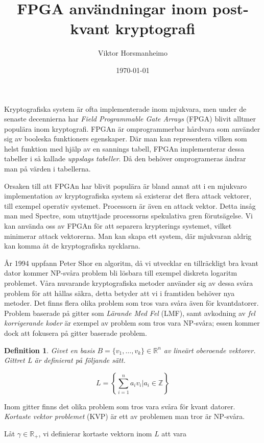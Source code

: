 \documentclass{paper}
\title{FPGA användningar inom post-kvant kryptografi}
\author{Viktor Horsmanheimo}
\date{\today}
\newtheorem{definition}{Definition}
\newcommand{\bR}{\mathbb{R}}
\newcommand{\bZ}{\mathbb{Z}}
\begin{document}
\maketitle

Kryptografiska system är ofta implementerade inom mjukvara, men under de
senaste decennierna har \textit{Field Programmable Gate Arrays} (FPGA) blivit
alltmer populära inom kryptografi. FPGAn är omprogrammerbar hårdvara som
använder sig av booleska funktioners egenskaper. Där man kan representera vilken
som helst funktion med hjälp av en sannings tabell, FPGAn implementerar dessa
tabeller i så kallade \textit{uppslags tabeller}. Då den behöver omprogrameras
ändrar man på värden i tabellerna.

Orsaken till att FPGAn har blivit populära är bland annat att i en mjukvaro
implementation av kryptografiska system så existerar det flera attack
vektorer, till exempel operativ systemet. Processorn är även en attack
vektor. Detta insåg man med Spectre, som utnyttjade processorns spekulativa
gren förutsägelse. Vi kan använda oss av FPGAn för att separera krypterings
systemet, vilket minimerar attack vektorerna. Man kan skapa ett system, där
mjukvaran aldrig kan komma åt de kryptografiska nycklarna.

År 1994 uppfann Peter Shor en algoritm, då vi utvecklar en tillräckligt bra kvant dator
kommer NP-svåra problem bli lösbara till exempel diskreta logaritm problemet.
Våra nuvarande kryptografiska metoder använder sig av dessa svåra problem för
att hållas säkra, detta betyder att vi i framtiden behöver nya metoder. Det
finns flera olika problem som tros vara svåra även för kvantdatorer.
Problem baserade på gitter som \textit{Lärande Med Fel} (LMF), samt avkodning av
\textit{fel korrigerande koder} är exempel av problem som tros vara NP-svåra;
essen kommer dock att fokusera på gitter baserade problem.

\begin{definition}
    Givet en basis $B = \{v_1, \ldots, v_k\} \in \bR^n$ av lineärt
    oberoende vektorer. Gittret L är definierat på följande sätt.

    \[L = \left\{ \sum_{i=1}^n a_i v_i | a_i \in \bZ \right\}\]

\end{definition}

Inom gitter finns det olika problem som tros vara svåra för kvant datorer.
\textit{Kortaste vektor problemet} (KVP) är ett av problemen man tror är NP-svåra.

Låt $\gamma \in \bR_+$, vi definierar kortaste vektorn inom $L$ att vara
\end{document}
